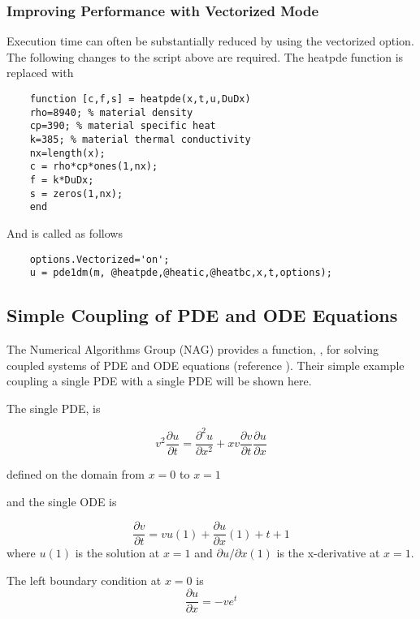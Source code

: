 \documentclass{article}
\begin{document}
\subsubsection{Improving Performance with Vectorized Mode}
Execution time can often be substantially reduced by using the
vectorized option. The following changes to the script above are
required. The {\mycode heatpde} function is replaced with

\begin{lstlisting}
	function [c,f,s] = heatpde(x,t,u,DuDx)
	rho=8940; % material density
	cp=390; % material specific heat
	k=385; % material thermal conductivity 
	nx=length(x);
	c = rho*cp*ones(1,nx);
	f = k*DuDx;
	s = zeros(1,nx);
	end
\end{lstlisting}

And \pde is called as follows
\begin{lstlisting}
	options.Vectorized='on';
	u = pde1dm(m, @heatpde,@heatic,@heatbc,x,t,options);
\end{lstlisting}

\newpage
\subsection{Simple Coupling of PDE and ODE Equations}
The Numerical Algorithms Group (NAG) provides a function, , for solving coupled systems of PDE and ODE equations (reference \cite{nagD03}).
Their simple example coupling a single PDE with a single PDE will be shown here.

The single PDE, is

\begin{equation}\label{eq_simple_ode_pde_1}
	v^2\frac{\partial u}{\partial t} = \frac{\partial^2 u}{\partial x^2} +
	x v \frac{\partial v}{\partial t} \frac{\partial u}{\partial x}
\end{equation}

defined on the domain from $x=0$ to $x=1$

and the single ODE is

\begin{equation}\label{eq_simple_ode_pde_2}
	\frac{\partial v}{\partial t} = v u(1) +\frac{\partial u}{\partial x}(1) + t + 1
\end{equation}
where $u(1)$ is the solution at $x=1$ and ${\partial u}/{\partial x}(1)$ is the
x-derivative at $x=1$.

The left boundary condition at $x = 0$ is
\begin{equation}
	\frac{\partial u}{\partial x}=-v e^t
\end{equation}
\end{document}
